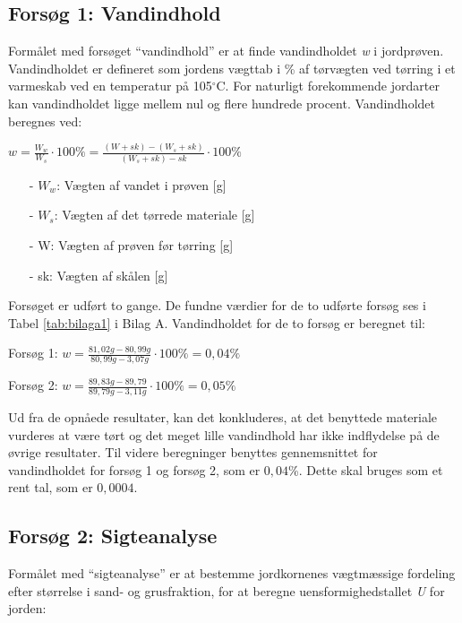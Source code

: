 \subsection{Forsøg 1: Vandindhold}
Formålet med forsøget “vandindhold” er at finde vandindholdet \textit{w} i jordprøven. Vandindholdet er defineret som jordens vægttab i \% af tørvægten ved tørring i et varmeskab ved en temperatur på 105$^{\circ}$C. For naturligt forekommende jordarter kan vandindholdet ligge mellem nul og flere hundrede procent.
\newline
\newline
Vandindholdet beregnes ved:

\begin{center}
	$w = \frac{W_w}{W_s}\cdot 100\% = \frac{(W+sk)-(W_s+sk)}{(W_s+sk)-sk}\cdot 100\%$
\end{center}

\begin{itemize}
	\item[-] $W_w$: Vægten af vandet i prøven [g]
	\item[-] $W_s$: Vægten af det tørrede materiale [g]
	\item[-] W: Vægten af prøven før tørring [g]
	\item[-] sk: Vægten af skålen [g]
\end{itemize}

Forsøget er udført to gange. De fundne værdier for de to udførte forsøg ses i Tabel \ref{tab:bilaga1} i Bilag A. Vandindholdet for de to forsøg er beregnet til:

\begin{center}
	Forsøg 1: $w = \frac{81,\!02 g - 80,\!99 g}{80,\!99 g - 3,\!07 g}\cdot 100\% = 0,\!04\%$
\end{center}

\begin{center}
	Forsøg 2: $w = \frac{89,\!83 g - 89,\!79}{89,\!79 g - 3,\!11 g}\cdot 100\% = 0,\!05\%$
\end{center}

Ud fra de opnåede resultater, kan det konkluderes, at det benyttede materiale vurderes at være tørt og det meget lille vandindhold har ikke indflydelse på de øvrige resultater.
\newline \indent{     }  Til videre beregninger benyttes gennemsnittet for vandindholdet for forsøg 1 og forsøg 2, som er $0,\!04$\%. Dette skal bruges som et rent tal, som er $0,\!0004$. 

\subsection{Forsøg 2: Sigteanalyse}
Formålet med “sigteanalyse” er at bestemme jordkornenes vægtmæssige fordeling efter størrelse i sand- og grusfraktion, for at beregne uensformighedstallet \textit{U} for jorden:

